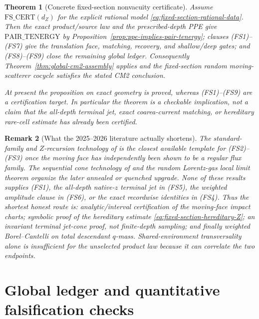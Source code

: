 \documentclass[11pt]{article}
\newtheorem{theorem}{Theorem}[section]
\newtheorem{remark}[theorem]{Remark}
\begin{document}
\begin{theorem}[Concrete fixed-section nonvacuity certificate]
\label{thm:fixed-section-nonvacuity-certificate}
Assume $\mathrm{FS\_CERT}(d_Z)$ for the explicit rational model
\eqref{eq:fixed-section-rational-data}.  Then the exact product/source law
and the prescribed-depth PPE give $\mathrm{PAIR\_TENERGY}$ by
Proposition~\ref{prop:ppe-implies-pair-tenergy}; clauses
\textup{(FS1)--(FS7)} give the translation face, matching, recovery, and
shallow/deep gates; and \textup{(FS8)--(FS9)} close the remaining global
ledger.  Consequently Theorem~\ref{thm:global-cm2-assembly} applies and the
fixed-section random moving-scatterer cocycle satisfies the stated CM2
conclusion.

At present the proposition on exact geometry is proved, whereas
\textup{(FS1)--(FS9)} are a certification target.  In particular the theorem
is a checkable implication, not a claim that the all-depth terminal jet,
exact coarea-current matching, or hereditary rare-cell estimate has already
been certified.
\end{theorem}

\begin{remark}[What the 2025--2026 literature actually shortens]
\label{rem:fixed-section-latest-literature}
The standard-family and $Z$-recursion technology of
\cite{CanestrariHoles} is the closest available template for
\textup{(FS2)--(FS3)} once the moving face has independently been shown to
be a regular flux family.  The sequential cone technology of
\cite{DLcones} and the random Lorentz-gas local limit
theorem \cite{DemersPeneZhang} organize the later annealed or quenched
upgrade.  None of these results supplies \textup{(FS1)}, the all-depth
native-$z$ terminal jet in \textup{(FS5)}, the weighted amplitude clause in
\textup{(FS6)}, or the exact recordwise identities in \textup{(FS4)}.
Thus the shortest honest route is: analytic/interval certification of the
moving-face impact charts; symbolic proof of the hereditary estimate
\eqref{eq:fixed-section-hereditary-Z}; an invariant terminal jet-cone proof,
not finite-depth sampling; and finally weighted Borel--Cantelli on total
descendant $q$-mass.  Shared-environment transversality alone is insufficient
for the unselected product law because it can correlate the two endpoints.
\end{remark}

\section{Global ledger and quantitative falsification checks}
\end{document}
